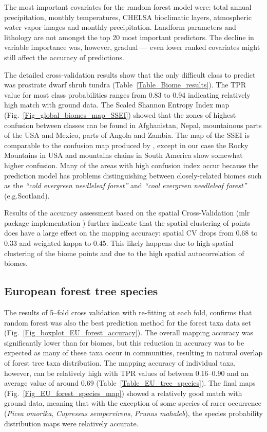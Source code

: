 \documentclass[fleqn,10pt,lineno]{wlpeerj} %
\begin{document}
The most important covariates for the random forest model were: total annual precipitation, monthly temperatures, CHELSA bioclimatic layers, atmospheric water vapor images and monthly precipitation. Landform parameters and lithology are not amongst the top 20 most important predictors. The decline in variable importance was, however, gradual --- even lower ranked covariates might still affect the accuracy of predictions. \par

The detailed cross-validation results show that the only difficult class to predict was prostrate dwarf shrub tundra (Table~\ref{Table_Biome_results}). The TPR value for most class probabilities ranges from 0.83 to 0.94 indicating relatively high match with ground data. The Scaled Shannon Entropy Index map (Fig.\@~\ref{Fig_global_biomes_map_SSEI}) showed that the zones of highest confusion between classes can be found in Afghanistan, Nepal, mountainous parts of the USA and Mexico, parts of Angola and Zambia. The map of the SSEI is comparable to the confusion map produced by \citet{levavasseur2012statistical}, except in our case the Rocky Mountains in USA and mountains chains in South America show somewhat higher confusion. Many of the areas with high confusion index occur because the prediction model has problems distinguishing between closely-related biomes such as the \emph{``cold evergreen needleleaf forest''} and \emph{``cool evergreen needleleaf forest''} (e.g.\@ Scotland).\par

Results of the accuracy assessment based on the spatial Cross-Validation (\textsf{mlr} package implementation \citep{mlr2016}) further indicate that the spatial clustering of points does have a large effect on the mapping accuracy: spatial CV drops from 0.68 to 0.33 and weighted kappa to 0.45. This likely happens due to high spatial clustering of the biome points and due to the high spatial autocorrelation of biomes.  \par

\subsection*{European forest tree species}

The results of 5--fold cross validation with re-fitting at each fold, confirms that random forest was also the best prediction method for the forest taxa data set (Fig.\@~\ref{Fig_boxplot_EU_forest_accuracy}). The overall mapping accuracy was significantly lower than for biomes, but this reduction in accuracy was to be expected as many of these taxa occur in communities, resulting in natural overlap of forest tree taxa distribution. The mapping accuracy of individual taxa, however, can be relatively high with TPR values of between 0.16--0.90 and an average value of around 0.69 (Table~\ref{Table_EU_tree_species}). The final maps (Fig.\@~\ref{Fig_EU_forest_species_map}) showed a relatively good match with ground data, meaning that with the exception of some species of rarer occurrence (\emph{Picea omorika}, \emph{Cupressus sempervirens}, \emph{Prunus mahaleb}), the species probability distribution maps were relatively accurate. \par
\end{document}
